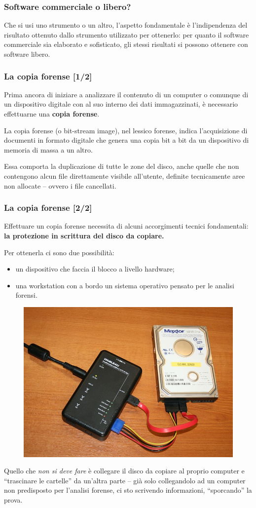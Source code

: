 \documentclass[11pt]{beamer}
\begin{document}
	\begin{frame}
		\frametitle{Software commerciale o libero?}
		Che si usi uno strumento o un altro, l'aspetto fondamentale è l'indipendenza del risultato ottenuto dallo strumento utilizzato per ottenerlo: per quanto il software commerciale sia elaborato e sofisticato, gli stessi risultati si possono ottenere con software libero.
	\end{frame}
	
	
	\begin{frame}
		\frametitle{La copia forense [1/2]}
		Prima ancora di iniziare a analizzare il contenuto di un computer o comunque di un dispositivo digitale con al suo interno dei dati immagazzinati, è necessario effettuarne una \textbf{copia forense}.
		
		\vfill
		La copia forense (o bit-stream image), nel lessico forense, indica l'acquisizione di documenti in formato digitale che genera una copia bit a bit da un dispositivo di memoria di massa a un altro.\cite{wiki:Copia_forense}
		
		\vfill
		
		Essa comporta la duplicazione di tutte le zone del disco, anche quelle che non contengono alcun file direttamente visibile all'utente, definite tecnicamente aree non allocate -- ovvero i file cancellati.
			
	\end{frame}
	
	\begin{frame}[shrink]
		\frametitle{La copia forense [2/2]}
		Effettuare un copia forense necessita di alcuni accorgimenti tecnici fondamentali: \textbf{la protezione in scrittura del disco da copiare.}
		
		Per ottenerla ci sono due possibilità:
		\begin{itemize}
			\item un dispositivo che faccia il blocco a livello hardware;
			\item una workstation con a bordo un sistema operativo pensato per le analisi forensi.
		\end{itemize}
		
		\begin{figure}
			\centering
			\includegraphics[width=0.25\linewidth]{pics/800px-Portable_forensic_tableau}
		
			\label{fig:800px-Portable_forensic_tableau}
		\end{figure}
		Quello che \emph{non si deve fare} è collegare il disco da copiare al proprio computer e ``trascinare le cartelle'' da un'altra parte -- già solo collegandolo ad un computer non predisposto per l'analisi forense, ci sto scrivendo informazioni, ``sporcando'' la prova.
				
	\end{frame}
	
\end{document}
